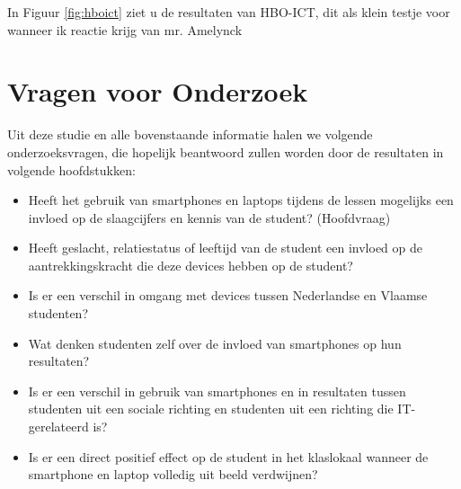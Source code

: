 In Figuur \ref{fig:hboict} ziet u de resultaten van HBO-ICT, dit als klein testje voor wanneer ik reactie krijg van mr. Amelynck

\section{Vragen voor Onderzoek}
\label{sec:eindliteratuur}

Uit deze studie en alle bovenstaande informatie halen we volgende onderzoeksvragen, die hopelijk beantwoord zullen worden door de resultaten in volgende hoofdstukken:

\begin{itemize}
	\item Heeft het gebruik van smartphones en laptops tijdens de lessen mogelijks een invloed op de slaagcijfers en kennis van de student? (Hoofdvraag)
	\item Heeft geslacht, relatiestatus of leeftijd van de student een invloed op de aantrekkingskracht die deze devices hebben op de student?
	\item Is er een verschil in omgang met devices tussen Nederlandse en Vlaamse studenten?
	\item Wat denken studenten zelf over de invloed van smartphones op hun resultaten?
	\item Is er een verschil in gebruik van smartphones en in resultaten tussen studenten uit een sociale richting en studenten uit een richting die IT-gerelateerd is?
	\item Is er een direct positief effect op de student in het klaslokaal wanneer de smartphone en laptop volledig uit beeld verdwijnen?
\end{itemize}
